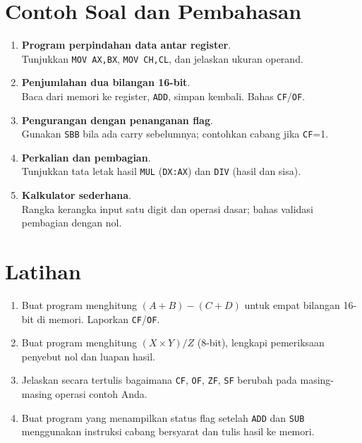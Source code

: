 \section{Contoh Soal dan Pembahasan}
\begin{enumerate}
  \item \textbf{Program perpindahan data antar register}.\\ Tunjukkan \texttt{MOV AX,BX}, \texttt{MOV CH,CL}, dan jelaskan ukuran operand.
  \item \textbf{Penjumlahan dua bilangan 16-bit}.\\ Baca dari memori ke register, \texttt{ADD}, simpan kembali. Bahas \texttt{CF}/\texttt{OF}.
  \item \textbf{Pengurangan dengan penanganan flag}.\\ Gunakan \texttt{SBB} bila ada carry sebelumnya; contohkan cabang jika \texttt{CF}=1.
  \item \textbf{Perkalian dan pembagian}.\\ Tunjukkan tata letak hasil \texttt{MUL} (\texttt{DX:AX}) dan \texttt{DIV} (hasil dan sisa).
  \item \textbf{Kalkulator sederhana}.\\ Rangka kerangka input satu digit dan operasi dasar; bahas validasi pembagian dengan nol.
\end{enumerate}

\section{Latihan}
\begin{enumerate}
  \item Buat program menghitung \((A+B) - (C+D)\) untuk empat bilangan 16-bit di memori. Laporkan \texttt{CF}/\texttt{OF}.
  \item Buat program menghitung \((X \times Y) / Z\) (8-bit), lengkapi pemeriksaan penyebut nol dan luapan hasil.
  \item Jelaskan secara tertulis bagaimana \texttt{CF}, \texttt{OF}, \texttt{ZF}, \texttt{SF} berubah pada masing-masing operasi contoh Anda.
  \item Buat program yang menampilkan status flag setelah \texttt{ADD} dan \texttt{SUB} menggunakan instruksi cabang bersyarat dan tulis hasil ke memori.
\end{enumerate}

